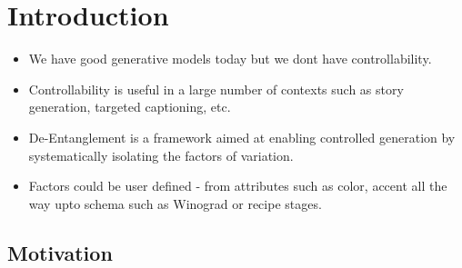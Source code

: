 \chapter{Introduction}


\begin{itemize}
    \item We have good generative models today but we dont have controllability. 
    \item Controllability is useful in a large number of contexts such as story generation, targeted captioning, etc. 
    \item De-Entanglement is a framework aimed at enabling controlled generation by systematically isolating the factors of variation. 
    \item Factors could be user defined - from attributes such as color, accent all the way upto schema such as Winograd or recipe stages.
    
\end{itemize}

\section{Motivation}

